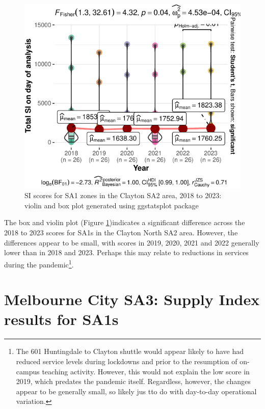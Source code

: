 \documentclass[]{tufte-book}
\begin{document}
\begin{figure}
\includegraphics{Reynolds_Currie_2024_transit_supply_index_GTFS_files/figure-latex/Compare_2018_to_2023_Clayton_within_stats-1} \caption[SI scores for SA1 zones in the Clayton SA2 area, 2018 to 2023]{SI scores for SA1 zones in the Clayton SA2 area, 2018 to 2023: violin and box plot generated using ggstatsplot package}\label{fig:Compare_2018_to_2023_Clayton_within_stats}
\end{figure}

The box and violin plot (Figure
\ref{fig:Compare_2018_to_2023_Clayton_within_stats})indicates a
significant difference across the 2018 to 2023 scores for SA1s in the
Clayton North SA2 area. However, the differences appear to be small,
with scores in 2019, 2020, 2021 and 2022 generally lower than in 2018
and 2023. Perhaps this may relate to reductions in services during the
pandemic\footnote{The 601 Huntingdale to Clayton shuttle would appear
  likely to have had reduced service levels during lockdowns and prior
  to the resumption of on-campus teaching activity. However, this would
  not explain the low score in 2019, which predates the pandemic itself.
  Regardless, however, the changes appear to be generally small, so
  likely jus tto do with day-to-day operational variation.}.

\hypertarget{melbourne-city-sa3-supply-index-results-for-sa1s}{%
\section{Melbourne City SA3: Supply Index results for
SA1s}\label{melbourne-city-sa3-supply-index-results-for-sa1s}}
\end{document}
